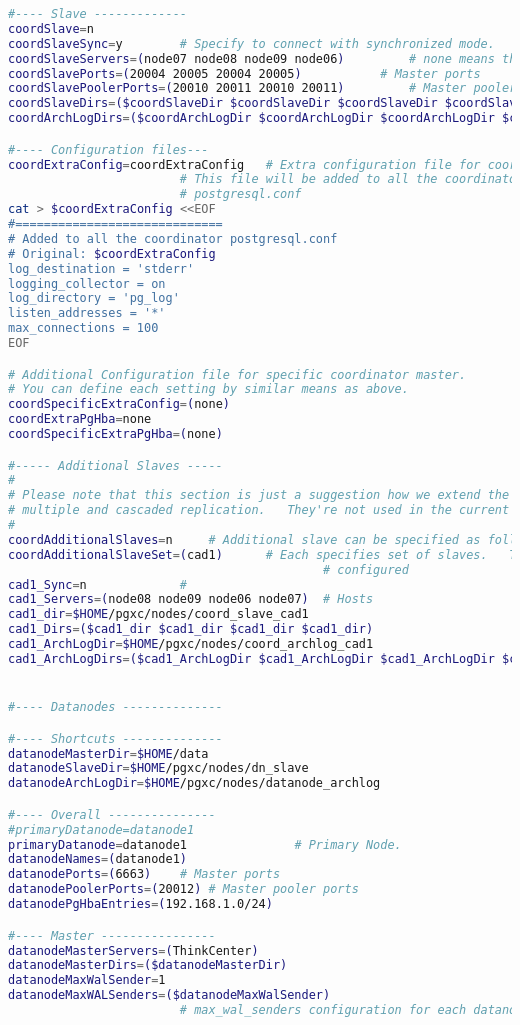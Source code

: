 \begin{lstlisting}[basicstyle=\tiny,language=bash,caption={Konfigurationsdatei pgxc-ctl}]
#---- Slave -------------
coordSlave=n			
coordSlaveSync=y		# Specify to connect with synchronized mode.
coordSlaveServers=(node07 node08 node09 node06)			# none means this slave is not available
coordSlavePorts=(20004 20005 20004 20005)			# Master ports
coordSlavePoolerPorts=(20010 20011 20010 20011)			# Master pooler ports
coordSlaveDirs=($coordSlaveDir $coordSlaveDir $coordSlaveDir $coordSlaveDir)
coordArchLogDirs=($coordArchLogDir $coordArchLogDir $coordArchLogDir $coordArchLogDir)

#---- Configuration files---
coordExtraConfig=coordExtraConfig	# Extra configuration file for coordinators.  
						# This file will be added to all the coordinators'
						# postgresql.conf
cat > $coordExtraConfig <<EOF
#=============================
# Added to all the coordinator postgresql.conf
# Original: $coordExtraConfig
log_destination = 'stderr'
logging_collector = on
log_directory = 'pg_log'
listen_addresses = '*'
max_connections = 100
EOF

# Additional Configuration file for specific coordinator master.
# You can define each setting by similar means as above.
coordSpecificExtraConfig=(none)
coordExtraPgHba=none	
coordSpecificExtraPgHba=(none)

#----- Additional Slaves -----
#
# Please note that this section is just a suggestion how we extend the configuration for
# multiple and cascaded replication.   They're not used in the current version.
#
coordAdditionalSlaves=n		# Additional slave can be specified as follows: where you
coordAdditionalSlaveSet=(cad1)		# Each specifies set of slaves.   This case, two set of slaves are
											# configured
cad1_Sync=n		  		#
cad1_Servers=(node08 node09 node06 node07)	# Hosts
cad1_dir=$HOME/pgxc/nodes/coord_slave_cad1
cad1_Dirs=($cad1_dir $cad1_dir $cad1_dir $cad1_dir)
cad1_ArchLogDir=$HOME/pgxc/nodes/coord_archlog_cad1
cad1_ArchLogDirs=($cad1_ArchLogDir $cad1_ArchLogDir $cad1_ArchLogDir $cad1_ArchLogDir)


#---- Datanodes --------------

#---- Shortcuts --------------
datanodeMasterDir=$HOME/data
datanodeSlaveDir=$HOME/pgxc/nodes/dn_slave
datanodeArchLogDir=$HOME/pgxc/nodes/datanode_archlog

#---- Overall ---------------
#primaryDatanode=datanode1				
primaryDatanode=datanode1				# Primary Node.
datanodeNames=(datanode1)
datanodePorts=(6663)	# Master ports
datanodePoolerPorts=(20012)	# Master pooler ports
datanodePgHbaEntries=(192.168.1.0/24)	

#---- Master ----------------
datanodeMasterServers=(ThinkCenter)	
datanodeMasterDirs=($datanodeMasterDir)
datanodeMaxWalSender=1
datanodeMaxWALSenders=($datanodeMaxWalSender)
						# max_wal_senders configuration for each datanode


\end{lstlisting}
